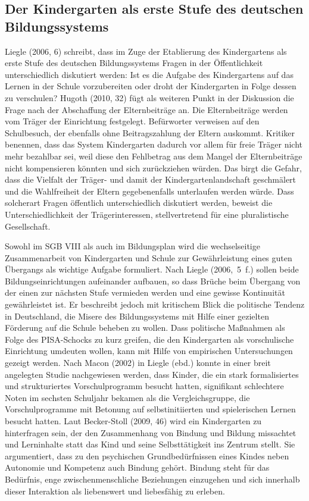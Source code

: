 \subsection{Der Kindergarten als erste Stufe des deutschen Bildungssystems}
Liegle (2006, 6) schreibt, dass im Zuge der Etablierung des Kindergartens als erste Stufe des deutschen Bildungssystems Fragen in der Öffentlichkeit unterschiedlich diskutiert werden: Ist es die Aufgabe des Kindergartens auf das Lernen in der Schule vorzubereiten oder droht der Kindergarten in Folge dessen zu verschulen? Hugoth (2010, 32) fügt als weiteren Punkt in der Diskussion die Frage nach der Abschaffung der Elternbeiträge an. Die Elternbeiträge werden vom Träger der Einrichtung festgelegt. Befürworter verweisen auf den Schulbesuch, der ebenfalls ohne Beitragszahlung der Eltern auskommt. Kritiker benennen, dass das System Kindergarten dadurch vor allem für freie Träger nicht mehr bezahlbar sei, weil diese den Fehlbetrag aus dem Mangel der Elternbeiträge nicht kompensieren könnten und sich zurückziehen würden. Das birgt die Gefahr, dass die Vielfalt der Träger- und damit der Kindergartenlandschaft geschmälert und die Wahlfreiheit der Eltern gegebenenfalls unterlaufen werden würde. Dass solcherart Fragen öffentlich unterschiedlich diskutiert werden, beweist die Unterschiedlichkeit der Trägerinteressen, stellvertretend für eine pluralistische Gesellschaft. 

Sowohl im SGB VIII als auch im Bildungsplan wird die wechselseitige Zusammenarbeit von Kindergarten und Schule zur Gewährleistung eines guten Übergangs als wichtige Aufgabe formuliert. Nach Liegle (2006,~5~f.) sollen beide Bildungseinrichtungen aufeinander aufbauen, so dass Brüche beim Übergang von der einen zur nächsten Stufe vermieden werden und eine gewisse Kontinuität gewährleistet ist. Er beschreibt jedoch mit kritischem Blick die politische Tendenz in Deutschland, die Misere des Bildungssystems mit Hilfe einer gezielten Förderung auf die Schule beheben zu wollen.
Dass politische Maßnahmen als Folge des PISA-Schocks zu kurz greifen, die den Kindergarten als vorschulische Einrichtung umdeuten wollen, kann mit Hilfe von empirischen Untersuchungen gezeigt werden. Nach  Macon (2002) in Liegle (ebd.) konnte in einer breit angelegten Studie nachgewiesen werden, dass Kinder, die ein stark formalisiertes und strukturiertes Vorschulprogramm besucht hatten, signifikant schlechtere Noten im sechsten Schuljahr bekamen als die Vergleichsgruppe, die Vorschulprogramme mit Betonung auf selbstinitiierten und spielerischen Lernen besucht hatten. 
Laut Becker-Stoll (2009, 46) wird ein Kindergarten zu hinterfragen sein, der den Zusammenhang von Bindung und Bildung missachtet und Lerninhalte statt das Kind und seine Selbsttätigkeit ins Zentrum stellt. Sie argumentiert, dass zu den psychischen Grundbedürfnissen eines Kindes neben Autonomie und Kompetenz auch Bindung gehört. Bindung steht für das Bedürfnis, enge zwischenmenschliche Beziehungen einzugehen und sich innerhalb dieser Interaktion als liebenswert und liebesfähig zu erleben. 
 
